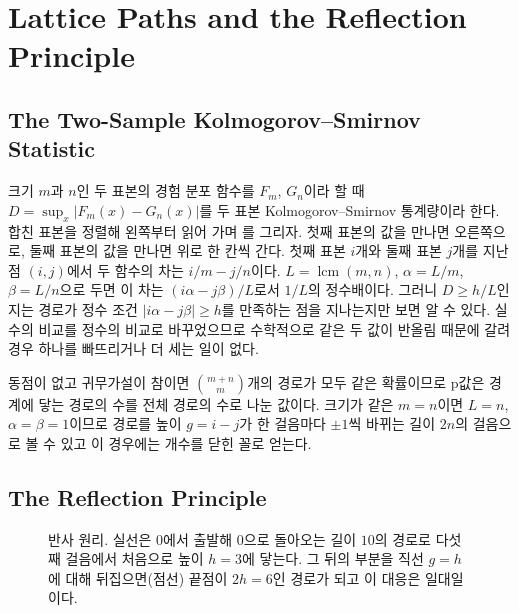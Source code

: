 \section{Lattice Paths and the Reflection Principle}
\label{sec:lattice}

\subsection{The Two-Sample Kolmogorov--Smirnov Statistic}

크기 $m$과 $n$인 두 표본의 경험 분포 함수를 $F_m$, $G_n$이라 할 때 $D=\sup_x|F_m(x)-G_n(x)|$를 두 표본 Kolmogorov--Smirnov 통계량이라 한다. 합친 표본을 정렬해 왼쪽부터 읽어 가며 를 그리자. 첫째 표본의 값을 만나면 오른쪽으로, 둘째 표본의 값을 만나면 위로 한 칸씩 간다. 첫째 표본 $i$개와 둘째 표본 $j$개를 지난 점 $(i,j)$에서 두 함수의 차는 $i/m-j/n$이다. $L=\operatorname{lcm}(m,n)$, $\alpha=L/m$, $\beta=L/n$으로 두면 이 차는 $(i\alpha-j\beta)/L$로서 $1/L$의 정수배이다. 그러니 $D\ge h/L$인지는 경로가 정수 조건 $|i\alpha-j\beta|\ge h$를 만족하는 점을 지나는지만 보면 알 수 있다. 실수의 비교를 정수의 비교로 바꾸었으므로 수학적으로 같은 두 값이 반올림 때문에 갈려 경우 하나를 빠뜨리거나 더 세는 일이 없다.

동점이 없고 귀무가설이 참이면 $\binom{m+n}m$개의 경로가 모두 같은 확률이므로 p값은 경계에 닿는 경로의 수를 전체 경로의 수로 나눈 값이다. 크기가 같은 $m=n$이면 $L=n$, $\alpha=\beta=1$이므로 경로를 높이 $g=i-j$가 한 걸음마다 $\pm1$씩 바뀌는 길이 $2n$의 걸음으로 볼 수 있고 이 경우에는 개수를 닫힌 꼴로 얻는다.

\subsection{The Reflection Principle}

\begin{figure}[htbp]
\centering
{}
\caption{반사 원리. 실선은 $0$에서 출발해 $0$으로 돌아오는 길이 $10$의 경로로 다섯째 걸음에서 처음으로 높이 $h=3$에 닿는다. 그 뒤의 부분을 직선 $g=h$에 대해 뒤집으면(점선) 끝점이 $2h=6$인 경로가 되고 이 대응은 일대일이다.}
\label{fig:reflection}
\end{figure}

